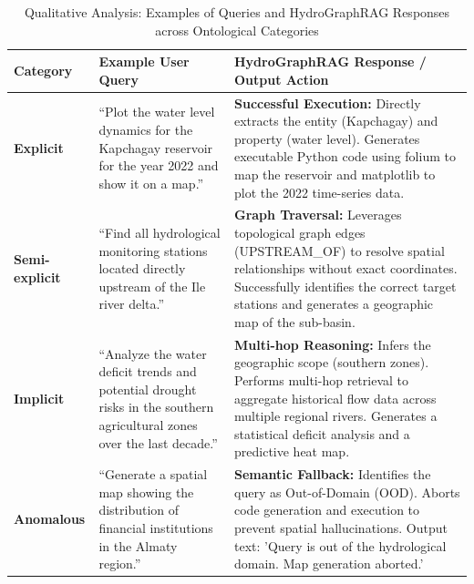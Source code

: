 \begin{table}[t]
\centering
\caption{Qualitative Analysis: Examples of Queries and HydroGraphRAG Responses across Ontological Categories}
\label{tab:query_examples}
\begin{tabularx}{\textwidth}{@{} l >{\raggedright\arraybackslash}X >{\raggedright\arraybackslash}X @{}}
\toprule
\textbf{Category} & \textbf{Example User Query} & \textbf{HydroGraphRAG Response / Output Action} \\ 
\midrule
\textbf{Explicit} & 
``Plot the water level dynamics for the Kapchagay reservoir for the year 2022 and show it on a map.'' & 
\textbf{Successful Execution:} Directly extracts the entity (Kapchagay) and property (water level). Generates executable Python code using folium to map the reservoir and matplotlib to plot the 2022 time-series data. \\ 
\addlinespace
\textbf{Semi-explicit} & 
``Find all hydrological monitoring stations located directly upstream of the Ile river delta.'' & 
\textbf{Graph Traversal:} Leverages topological graph edges (UPSTREAM_OF) to resolve spatial relationships without exact coordinates. Successfully identifies the correct target stations and generates a geographic map of the sub-basin. \\ 
\addlinespace
\textbf{Implicit} & 
``Analyze the water deficit trends and potential drought risks in the southern agricultural zones over the last decade.'' & 
\textbf{Multi-hop Reasoning:} Infers the geographic scope (southern zones). Performs multi-hop retrieval to aggregate historical flow data across multiple regional rivers. Generates a statistical deficit analysis and a predictive heat map. \\ 
\addlinespace
\textbf{Anomalous} & 
``Generate a spatial map showing the distribution of financial institutions in the Almaty region.'' & 
\textbf{Semantic Fallback:} Identifies the query as Out-of-Domain (OOD). Aborts code generation and execution to prevent spatial hallucinations. Output text: 'Query is out of the hydrological domain. Map generation aborted.' \\ 
\bottomrule
\end{tabularx}
\end{table}